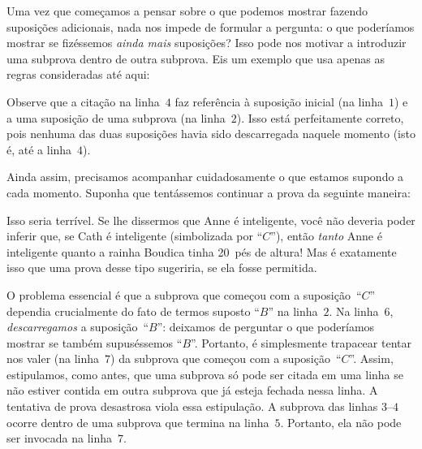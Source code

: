 Uma vez que começamos a pensar sobre o que podemos mostrar fazendo suposições adicionais, nada nos impede de formular a pergunta: o que poderíamos mostrar se fizéssemos \emph{ainda mais} suposições? Isso pode nos motivar a introduzir uma subprova dentro de outra subprova. Eis um exemplo que usa apenas as regras consideradas até aqui:
\begin{fitchproof}
\PR
\open
	\AS
	\open
		\AS
	\close
\close
{}
\end{fitchproof}
Observe que a citação na linha~$4$ faz referência à suposição inicial
(na linha~$1$) e a uma suposição de uma subprova (na
linha~$2$). Isso está perfeitamente correto, pois nenhuma das duas suposições havia
sido descarregada naquele momento (isto é, até a linha~$4$).

Ainda assim, precisamos acompanhar cuidadosamente o que estamos supondo a cada momento. Suponha que tentássemos continuar a prova da seguinte maneira:
\begin{fitchproof}
\PR
\open
	\AS
	\open
		\AS
	\close
\close
{}
\ifHTMLtarget
\else
	 
\fi
\end{fitchproof}
Isso seria terrível. Se lhe dissermos que Anne é inteligente, você não
deveria poder inferir que, se Cath é inteligente (simbolizada por \textquotedblleft$C$\textquotedblright{}), então
\emph{tanto} Anne é inteligente quanto a rainha Boudica tinha 20~pés de altura! Mas
é exatamente isso que uma prova desse tipo sugeriria, se ela fosse permitida.

O problema essencial é que a subprova que começou com a suposição~\textquotedblleft$C$\textquotedblright{} dependia crucialmente do fato de termos suposto \textquotedblleft$B$\textquotedblright{} na linha~$2$. Na linha~$6$, \emph{descarregamos} a suposição~\textquotedblleft$B$\textquotedblright{}: deixamos de perguntar o que poderíamos mostrar se também supuséssemos \textquotedblleft$B$\textquotedblright{}. Portanto, é simplesmente trapacear tentar nos valer (na linha~$7$) da subprova que começou com a suposição~\textquotedblleft$C$\textquotedblright{}. Assim, estipulamos, como antes, que uma subprova só pode ser citada em uma linha se não estiver contida em outra subprova que já esteja fechada nessa linha. A tentativa de prova desastrosa viola essa estipulação. A subprova das linhas $3$--$4$ ocorre dentro de uma subprova que termina na linha~$5$. Portanto, ela não pode ser invocada na linha~$7$.

